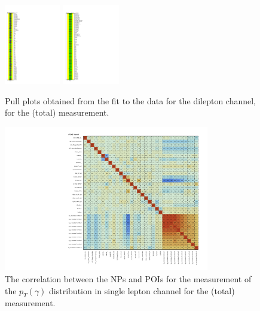 \begin{figure}[ht]
  \centering
  \includegraphics[width=0.22\textwidth]{figures/diff_xsec/dilep_tty_total_mu_blinded/compare_NP_pulls/compare_NP_dilep_fits_detall_dphill_eta/NuisPar_comp.pdf}
  \quad \quad
  \includegraphics[width=0.22\textwidth]{figures/diff_xsec/dilep_tty_total_mu_blinded/compare_NP_pulls/compare_NP_dilep_fits_drphb_drlj/NuisPar_comp.pdf}
  \caption{Pull plots obtained from the fit to the data for the dilepton channel, for the \tty (total) measurement.}
  \label{fig:pull_plot_pt_dilep_mu_blinded_2_tty_total}
\end{figure}
\FloatBarrier


\begin{figure}[ht]
  \centering
  \includegraphics[width=0.8\textwidth]{figures/diff_xsec/ljet_tty_total_mu_blinded/correlations/tty1l_pt_all_syst/CorrMatrix.pdf}
  \caption{The correlation between the NPs and POIs for the measurement of 
  the $p_T(\gamma)$ distribution in single lepton channel for the \tty (total) measurement.}
  \label{fig:NP-corr_ljet_mu_blinded_tty_total}
\end{figure}
\FloatBarrier


